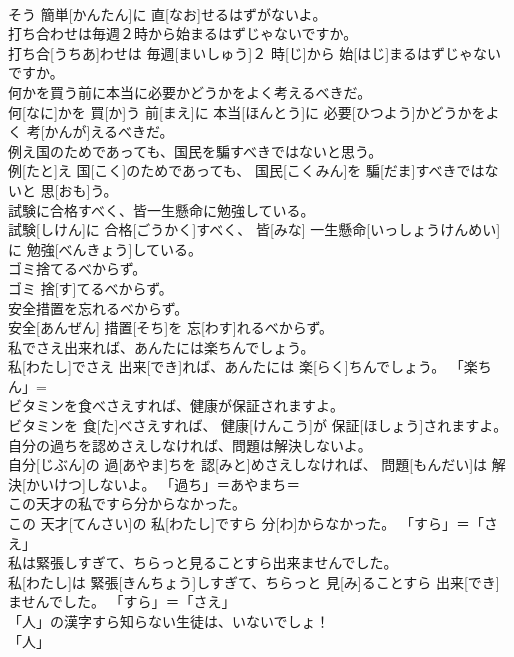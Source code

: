 \documentclass[8pt]{extreport}
\begin{document}
\begin{CJK}{UTF8}{min}
\\	そう 簡単[かんたん]に 直[なお]せるはずがないよ。	
\\	打ち合わせは毎週２時から始まるはずじゃないですか。	
\\	打ち合[うちあ]わせは 毎週[まいしゅう]２ 時[じ]から 始[はじ]まるはずじゃないですか。	
\\	何かを買う前に本当に必要かどうかをよく考えるべきだ。	
\\	何[なに]かを 買[か]う 前[まえ]に 本当[ほんとう]に 必要[ひつよう]かどうかをよく 考[かんが]えるべきだ。	
\\	例え国のためであっても、国民を騙すべきではないと思う。	
\\	例[たと]え 国[こく]のためであっても、 国民[こくみん]を 騙[だま]すべきではないと 思[おも]う。	
\\	試験に合格すべく、皆一生懸命に勉強している。	
\\	試験[しけん]に 合格[ごうかく]すべく、 皆[みな] 一生懸命[いっしょうけんめい]に 勉強[べんきょう]している。	
\\	ゴミ捨てるべからず。	
\\	ゴミ 捨[す]てるべからず。	
\\	安全措置を忘れるべからず。	
\\	安全[あんぜん] 措置[そち]を 忘[わす]れるべからず。	
\\	私でさえ出来れば、あんたには楽ちんでしょう。	
\\	私[わたし]でさえ 出来[でき]れば、あんたには 楽[らく]ちんでしょう。	「楽ちん」= 
\\	ビタミンを食べさえすれば、健康が保証されますよ。	
\\	ビタミンを 食[た]べさえすれば、 健康[けんこう]が 保証[ほしょう]されますよ。	
\\	自分の過ちを認めさえしなければ、問題は解決しないよ。	
\\	自分[じぶん]の 過[あやま]ちを 認[みと]めさえしなければ、 問題[もんだい]は 解決[かいけつ]しないよ。	「過ち」＝あやまち＝ 
\\	この天才の私ですら分からなかった。	
\\	この 天才[てんさい]の 私[わたし]ですら 分[わ]からなかった。	「すら」＝「さえ」
\\	私は緊張しすぎて、ちらっと見ることすら出来ませんでした。	
\\	私[わたし]は 緊張[きんちょう]しすぎて、ちらっと 見[み]ることすら 出来[でき]ませんでした。	「すら」＝「さえ」
\\	「人」の漢字すら知らない生徒は、いないでしょ！	
\\	「人」

\end{CJK}
\end{document}
